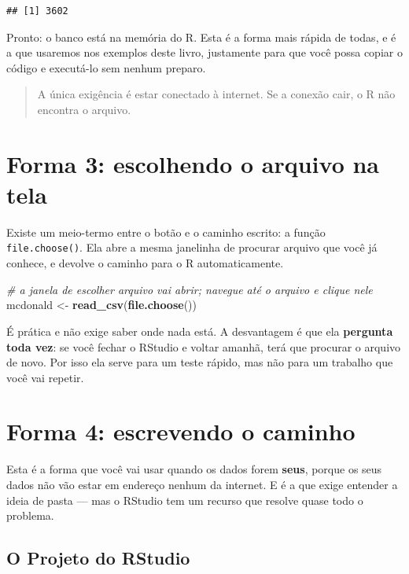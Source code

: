 \documentclass[
]{book}
\newenvironment{Shaded}{\begin{snugshade}}{\end{snugshade}}
\newcommand{\CommentTok}[1]{\textcolor[rgb]{0.56,0.35,0.01}{\textit{#1}}}
\newcommand{\FunctionTok}[1]{\textcolor[rgb]{0.13,0.29,0.53}{\textbf{#1}}}
\newcommand{\NormalTok}[1]{#1}
\newcommand{\OtherTok}[1]{\textcolor[rgb]{0.56,0.35,0.01}{#1}}
\begin{document}
\begin{verbatim}
## [1] 3602
\end{verbatim}

Pronto: o banco está na memória do R. Esta é a forma mais rápida de todas, e é a que usaremos nos exemplos deste livro, justamente para que você possa copiar o código e executá-lo sem nenhum preparo.

\begin{quote}
A única exigência é estar conectado à internet. Se a conexão cair, o R não encontra o arquivo.
\end{quote}

\section{Forma 3: escolhendo o arquivo na tela}\label{forma-3-escolhendo-o-arquivo-na-tela}

Existe um meio-termo entre o botão e o caminho escrito: a função \texttt{file.choose()}. Ela abre a mesma janelinha de procurar arquivo que você já conhece, e devolve o caminho para o R automaticamente.

\begin{Shaded}
\begin{Highlighting}[]
\CommentTok{\# a janela de escolher arquivo vai abrir; navegue até o arquivo e clique nele}
\NormalTok{mcdonald }\OtherTok{\textless{}{-}} \FunctionTok{read\_csv}\NormalTok{(}\FunctionTok{file.choose}\NormalTok{())}
\end{Highlighting}
\end{Shaded}

É prática e não exige saber onde nada está. A desvantagem é que ela \textbf{pergunta toda vez}: se você fechar o RStudio e voltar amanhã, terá que procurar o arquivo de novo. Por isso ela serve para um teste rápido, mas não para um trabalho que você vai repetir.

\section{Forma 4: escrevendo o caminho}\label{forma-4-escrevendo-o-caminho}

Esta é a forma que você vai usar quando os dados forem \textbf{seus}, porque os seus dados não vão estar em endereço nenhum da internet. E é a que exige entender a ideia de pasta --- mas o RStudio tem um recurso que resolve quase todo o problema.

\subsection{O Projeto do RStudio}\label{o-projeto-do-rstudio}
\end{document}
